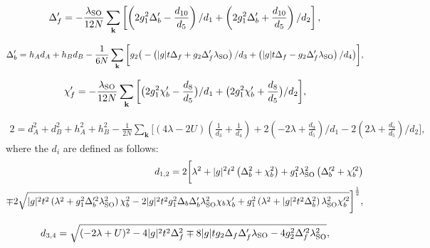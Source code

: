 \documentclass[aps,prb,twocolumn,superscriptaddress,showpacs]{revtex4-1}
\begin{document}
\begin{widetext}
\begin{equation}
\label{eq-Deltafp}
\Delta_{f}^{\prime}=-\frac{\lambda_{\rm{SO}}}{12N}\sum_{\textbf{k}}\left[   \left(2 g_1^2 \Delta_{b}^{\prime}-\frac{d_{10}}{d_5}\right)/d_1+\left(2 g_1^2 \Delta_{b}^{\prime}+\frac{d_{10}}{d_5} \right)/d_2   \right],
\end{equation}

\begin{equation}
\label{eq-Deltabp}
\Delta_{b}^{\prime}=h_A d_A + h_B d_B-\frac{1}{6N}\sum_{\textbf{k}}\bigg[   g_2\big(
            - \left( |g|t\Delta_f+g_2\Delta_{f}^{\prime} \lambda_{\rm{SO}}\right)/d_3
            + \left( |g|t\Delta_f-g_2\Delta_{f}^{\prime} \lambda_{\rm{SO}}\right)/d_4\big) \bigg],
\end{equation}

\begin{equation}
\label{eq-chifp}
\chi_{f}^{\prime}=-\frac{\lambda_{\rm{SO}}}{12N}\sum_{\textbf{k}}\bigg[
              \big(2 g_1^2 \chi_{b}^{\prime}-\frac{d_8} {d_5} \big)/d_1
            +\big (2 g_1^2 \chi_{b}^{\prime}+ \frac{d_8} {d_5} \big)/d_2
 \bigg ],
\end{equation}

\begin{eqnarray}
\label{eq-lambda}
2=d_A^2+d_B^2+h_A^2+h_B^2-\frac{1}{2N}\sum_{\textbf{k}}\bigg[   (4 \lambda-2U) \left(\frac{1}{d_3} +\frac{1}{d_4} \right )+ 2\left(-2\lambda+\frac{d_9}{d_5}\right)/d_1- 2\left(2\lambda+\frac{d_9}{d_5}\right)/d_2  \bigg],
\end{eqnarray}
where the $d_i$ are defined as follows:
\begin{eqnarray}
d_{1,2}=2 \bigg[ \lambda^2+|g|^2 t^2 \left(\Delta _b^2+\chi _b^2\right)+g_1^2 \lambda_{\rm{SO}}^2 \left(\Delta_{b}^{\prime 2}+\chi_{b}^{\prime 2}\right) \nonumber
\\ \mp 2 \sqrt{|g|^2 t^2 \left(\lambda^2+g_1^2 \Delta_{b}^{\prime 2} \lambda_{\rm{SO}}^2\right) \chi _b^2-2 |g|^2 t^2 g_1^2 \Delta _b \Delta_{b}^{\prime} \lambda_{\rm{SO}}^2 \chi _b \chi_{b}^{\prime}+g_1^2 \left(\lambda^2+|g|^2 t^2 \Delta _b^2\right) \lambda_{\rm{SO}}^2 \chi_{b}^{\prime 2}}\bigg]^{\frac{1}{2}},
\end{eqnarray}

\begin{eqnarray}
d_{3,4}=\sqrt{(-2 \lambda+U)^2-4 |g|^2 t^2 \Delta _f^2 \mp 8 |g| t g_2 \Delta _f \Delta_{f}^{\prime} \lambda_{\rm{SO}}-4 g_2^2 \Delta_{f}^{\prime 2} \lambda_{\rm{SO}}^2},
\end{eqnarray}


\end{widetext}
\end{document}
